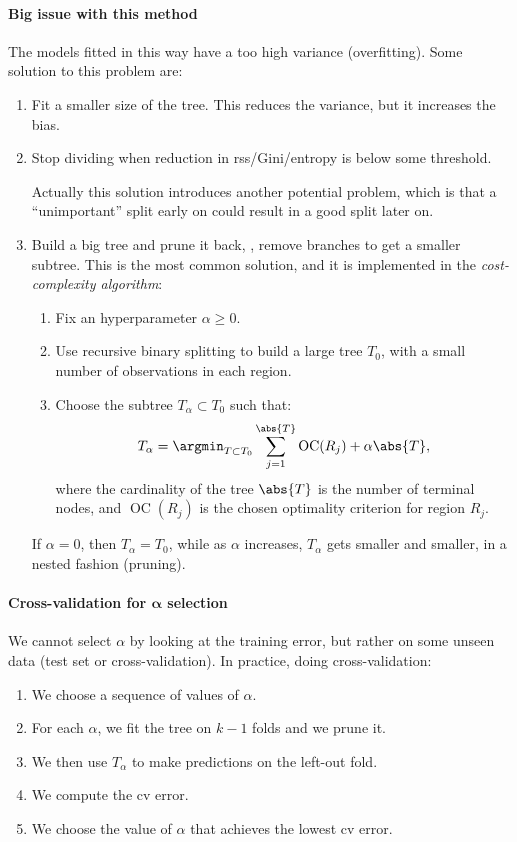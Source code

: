 \paragraph{Big issue with this method} The models fitted in this way have a too high variance (overfitting). Some solution to this problem are:
\begin{enumerate}
    \item Fit a smaller size of the tree. This reduces the variance, but it increases the bias.
    \item Stop dividing when reduction in \acs{rss}/Gini/entropy is below some threshold.
          \begin{note}
              Actually this solution introduces another potential problem, which is that a ``unimportant'' split early on could result in a good split later on.
          \end{note}
    \item Build a big tree and prune it back, \ie, remove branches to get a smaller subtree. This is the most common solution, and it is implemented in the \emph{cost-complexity algorithm}:
          \begin{enumerate}
              \item Fix an hyperparameter $\alpha \geq 0$.
              \item Use recursive binary splitting to build a large tree $T_0$, with a small number of observations in each region.
              \item Choose the subtree $T_\alpha \subset T_0$ such that:
                    \begin{equation}
                        T_\alpha = \argmin_{T \subset T_0} \sum_{j = 1}^{\abs{T}} \operatorname{OC}(R_j) + \alpha \abs{T},
                    \end{equation}
                    where the cardinality of the tree $\abs{T}$ is the number of terminal nodes, and $\operatorname{OC}(R_j)$ is the chosen optimality criterion for region $R_j$.
          \end{enumerate}
          If $\alpha = 0$, then $T_\alpha = T_0$, while as $\alpha$ increases, $T_\alpha$ gets smaller and smaller, in a nested fashion (pruning).
\end{enumerate}

\paragraph{Cross-validation for $\bm{\alpha}$ selection} We cannot select $\alpha$ by looking at the training error, but rather on some unseen data (test set or cross-validation). In practice, doing cross-validation:
\begin{enumerate}[beginpenalty=10000]
    \item We choose a sequence of values of $\alpha$.
    \item For each $\alpha$, we fit the tree on $k-1$ folds and we prune it.
    \item We then use $T_\alpha$ to make predictions on the left-out fold.
    \item We compute the \acs{cv} error.
    \item We choose the value of $\alpha$ that achieves the lowest \acs{cv} error.
\end{enumerate}